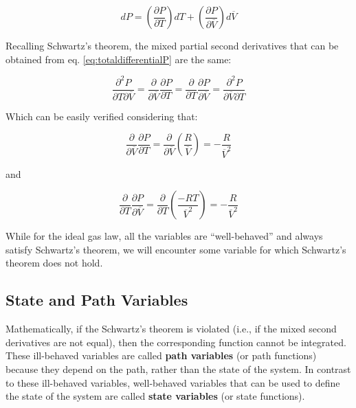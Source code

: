 \documentclass[
  9pt,
]{extbook}
\theoremstyle{definition}
\theoremstyle{definition}
\theoremstyle{definition}
\theoremstyle{definition}
\theoremstyle{remark}
\begin{document}
\begin{equation}
  dP=\left( \frac{\partial P}{\partial T} \right)dT + \left( \frac{\partial P}{\partial \overline{V}} \right)d\overline{V}
  \label{eq:totaldifferentialP}
\end{equation}

Recalling Schwartz's theorem, the mixed partial second derivatives that can be obtained from eq. \eqref{eq:totaldifferentialP} are the same:

\begin{equation}
  \frac{\partial^2 P}{\partial T \partial \overline{V}}=\frac{\partial}{\partial \overline{V}}\frac{\partial P}{\partial T}=\frac{\partial}{\partial T}\frac{\partial P}{\partial \overline{V}}=\frac{\partial^2 P}{\partial \overline{V} \partial T}
  \label{eq:schwartzP}
\end{equation}

Which can be easily verified considering that:

\begin{equation}
  \frac{\partial}{\partial \overline{V}} \frac{\partial P}{\partial T}  = \frac{\partial}{\partial \overline{V}} \left(\frac{R}{\overline{V}}\right) = -\frac{R}{\overline{V}^2} 
  \label{eq:secondderPA}
\end{equation}

and

\begin{equation}
  \frac{\partial}{\partial T} \frac{\partial P}{\partial \overline{V}}  = \frac{\partial}{\partial T} \left(\frac{-RT}{\overline{V}^2}\right) = -\frac{R}{\overline{V}^2} 
  \label{eq:secondderPB}
\end{equation}

While for the ideal gas law, all the variables are ``well-behaved'' and always satisfy Schwartz's theorem, we will encounter some variable for which Schwartz's theorem does not hold.

\subsection{State and Path Variables}\label{state-and-path-variables}

Mathematically, if the Schwartz's theorem is violated (i.e., if the mixed second derivatives are not equal), then the corresponding function cannot be integrated. These ill-behaved variables are called \textbf{path variables} (or path functions) because they depend on the path, rather than the state of the system. In contrast to these ill-behaved variables, well-behaved variables that can be used to define the state of the system are called \textbf{state variables} (or state functions).
\end{document}
